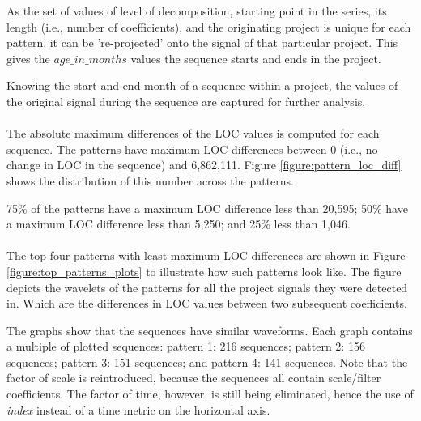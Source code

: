 As the set of values of level of decomposition, starting point in the series,
its length (i.e., number of coefficients), and the originating project is
unique for each pattern, it can be 're-projected' onto the signal of that
particular project. This gives the $age\_in\_months$ values the sequence starts
and ends in the project.

Knowing the start and end month of a sequence within a project, the values of
the original signal during the sequence are captured for further analysis.

\paragraph{}
The absolute maximum differences of the LOC values is computed for each
sequence. The patterns have maximum LOC differences between 0 (i.e., no change
in LOC in the sequence) and 6,862,111. Figure \ref{figure:pattern_loc_diff}
shows the distribution of this number across the patterns.



75\% of the patterns have a maximum LOC difference less than 20,595; 50\% have
a maximum LOC difference less than 5,250; and 25\% less than 1,046.

\paragraph{}
The top four patterns with least maximum LOC differences are shown in Figure
\ref{figure:top_patterns_plots} to illustrate how such patterns look like. The
figure depicts the wavelets of the patterns for all the project signals they
were detected in. Which are the differences in LOC values between two subsequent
coefficients.

The graphs show that the sequences have similar waveforms. Each graph contains
a multiple of plotted sequences: pattern 1: 216 sequences; pattern 2: 156
sequences; pattern 3: 151 sequences; and pattern 4: 141 sequences. Note that
the factor of scale is reintroduced, because the sequences all contain
scale/filter coefficients. The factor of time, however, is still being
eliminated, hence the use of \emph{index }\rm instead of a time metric on the
horizontal axis.



\begin{comment}
- Factual results
- Tables and figures for clarification

This chapter presents and clarifies the results obtained during the research.
The focus should be on the factual results, not the interpretation or
discussion. Tables and graphics should be used to increase the clarity of the
results where applicable.
Have a look at the the results chapter in this example thesis on Paul’s
homepage\footnote{http://homepages.cwi.nl/~paulk/thesesMasterSoftwareEngineering/2006/ArnoldLankamp.pdf}.
\end{comment}
